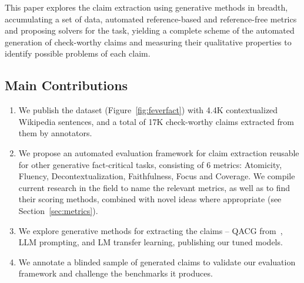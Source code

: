 This paper explores the claim extraction using generative methods in breadth, accumulating a set of data, automated reference-based and reference-free metrics and proposing solvers for the task, yielding a complete scheme of the automated generation of check-worthy claims and measuring their qualitative properties to identify possible problems of each claim.

\subsection{Main Contributions}
\begin{enumerate}
    \item We publish the \ds{} dataset (Figure~\ref{fig:feverfact}) with 4.4K contextualized Wikipedia sentences, and a total of 17K check-worthy claims extracted from them by annotators.
    \item We propose an automated evaluation framework for claim extraction reusable for other generative fact-critical tasks, consisting of 6 metrics: Atomicity, Fluency, Decontextualization, Faithfulness, Focus and Coverage.
    We compile current research in the field to name the relevant metrics, as well as to find their scoring methods, combined with novel ideas where appropriate (see Section~\ref{sec:metrics}).
    \item We explore generative methods for extracting the \ds{} claims -- QACG from~\cite{pan-etal-2021-zero}, LLM prompting, and LM transfer learning, publishing our tuned models.  
    \item We annotate a blinded sample of generated claims to validate our evaluation framework and challenge the benchmarks it produces.
\end{enumerate}

%

